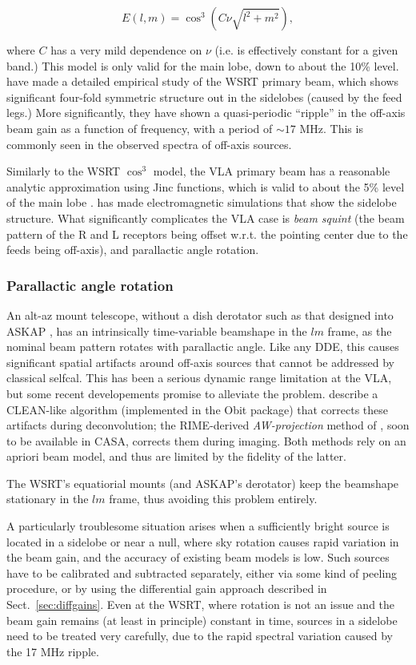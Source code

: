 \documentclass[]{aa}
\begin{document}
\[
E(l,m) = \cos^3(C\nu\sqrt{l^2+m^2}),
\]

where $C$ has a very mild dependence on $\nu$ (i.e. is effectively constant for a given band.) This model is only valid for the main lobe, down to about the 10\% level. \citet{Popping-Braun:WSRT-beam} have made a detailed empirical study of the WSRT primary beam, which shows significant four-fold symmetric structure out in the sidelobes (caused by the feed legs.) More significantly, they have shown a quasi-periodic ``ripple'' in the off-axis beam gain as a function of frequency, with a period of $\sim17$ MHz. This is commonly seen in the observed spectra of off-axis sources.

Similarly to the WSRT $\cos^3$ model, the VLA primary beam has a reasonable analytic approximation using Jinc functions, which is valid to about the 5\% level of the main lobe \citep{Uson-Cotton:VLA-beam}. \citet{Brisken:VLA-beam} has made electromagnetic simulations that show the sidelobe structure. What significantly complicates the VLA case is {\em beam squint} (the beam pattern of the R and L receptors being offset w.r.t. the pointing center due to the feeds being off-axis), and parallactic angle rotation.

\subsubsection{Parallactic angle rotation}

An alt-az mount telescope, without a dish derotator such as that designed into ASKAP \citep{ASKAP}, has an intrinsically time-variable beamshape in the $lm$ frame, as the nominal beam pattern rotates with parallactic angle. Like any DDE, this causes significant spatial artifacts around off-axis sources that cannot be addressed by classical selfcal. This has been a serious dynamic range limitation at the VLA, but some recent developements promise to alleviate the problem. \citet{Uson-Cotton:VLA-beam} describe a CLEAN-like algorithm (implemented in the Obit package) that corrects these artifacts during deconvolution; the RIME-derived {\em AW-projection} method of \citet{SB:imageplane}, soon to be available in CASA, corrects them during imaging. Both methods rely on an apriori beam model, and thus are limited by the fidelity of the latter.

The WSRT's equatiorial mounts (and ASKAP's derotator) keep the beamshape stationary in the $lm$ frame, thus avoiding this problem entirely.

A particularly troublesome situation arises when a sufficiently bright source is located in a sidelobe or near a null, where sky rotation causes rapid variation in the beam gain, and the accuracy of existing beam models is low. Such sources have to be calibrated and subtracted separately, either via some kind of peeling procedure, or by using the differential gain approach described in Sect.~\ref{sec:diffgains}. Even at the WSRT, where rotation is not an issue and the beam gain remains (at least in principle) constant in time, sources in a sidelobe need to be treated very carefully, due to the rapid spectral variation caused by the 17 MHz ripple.
\end{document}
